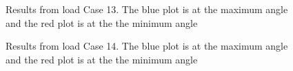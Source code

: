 \begin{figure}[H]
\hfill
{}\hfill
\caption[$\; \:$Results from load Case 13]{Results from load Case 13. The blue plot is at the maximum angle and the red plot is at the the minimum angle}
\label{fig:r13}
\end{figure}

\begin{figure}[H]
\hfill
{}\hfill
\caption[$\; \:$Results from load Case 14]{Results from load Case 14. The blue plot is at the maximum angle and the red plot is at the the minimum angle}
\label{fig:r14}
\end{figure}

